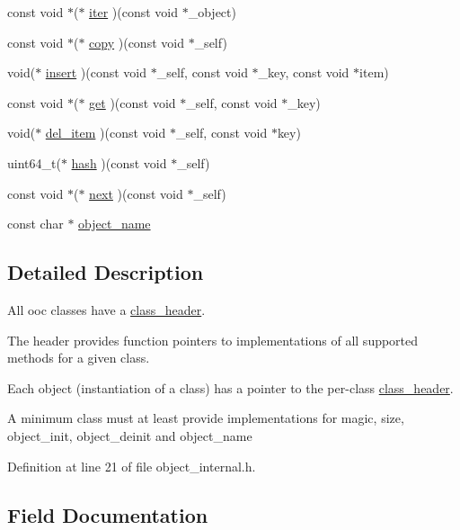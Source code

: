 \begin{DoxyCompactItemize}
\item 
const void $\ast$($\ast$ \mbox{\hyperlink{structclass__header_ab45bdc16b08b8cde751d161dd0c4f230}{iter}} )(const void $\ast$\+\_\+object)
\item 
const void $\ast$($\ast$ \mbox{\hyperlink{structclass__header_a26ec3e94c98bf5d3eff10d37cf2696ef}{copy}} )(const void $\ast$\+\_\+self)
\item 
void($\ast$ \mbox{\hyperlink{structclass__header_ada4fc11b4f09e8248a28c7d2e39e17ea}{insert}} )(const void $\ast$\+\_\+self, const void $\ast$\+\_\+key, const void $\ast$item)
\item 
const void $\ast$($\ast$ \mbox{\hyperlink{structclass__header_ab2de24bb8c5d3b1b5e74a69bb6c307b2}{get}} )(const void $\ast$\+\_\+self, const void $\ast$\+\_\+key)
\item 
void($\ast$ \mbox{\hyperlink{structclass__header_a4d88d979ecf23c184577d937454ab973}{del\+\_\+item}} )(const void $\ast$\+\_\+self, const void $\ast$key)
\item 
uint64\+\_\+t($\ast$ \mbox{\hyperlink{structclass__header_aa0035a2c833b1e46f0ae401d6b44ee65}{hash}} )(const void $\ast$\+\_\+self)
\item 
const void $\ast$($\ast$ \mbox{\hyperlink{structclass__header_a34b23ea4b047e4526bfb743d5be3e69c}{next}} )(const void $\ast$\+\_\+self)
\item 
const char $\ast$ \mbox{\hyperlink{structclass__header_af7f2f5623c98afb59519062172644350}{object\+\_\+name}}
\end{DoxyCompactItemize}


\subsection{Detailed Description}
All ooc classes have a \mbox{\hyperlink{structclass__header}{class\+\_\+header}}.

The header provides function pointers to implementations of all supported methods for a given class.

Each object (instantiation of a class) has a pointer to the per-\/class \mbox{\hyperlink{structclass__header}{class\+\_\+header}}.

A minimum class must at least provide implementations for magic, size, object\+\_\+init, object\+\_\+deinit and object\+\_\+name 

Definition at line 21 of file object\+\_\+internal.\+h.



\subsection{Field Documentation}
\mbox{\label{structclass__header_a10e4c230bf810df38e3581caabad02bb}} 

